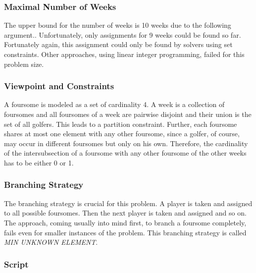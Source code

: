 \documentclass[a4paper]{scrartcl}
\begin{document}
\subsubsection{Maximal Number of Weeks}
The upper bound for the number of weeks is 10 weeks due to 
the following argument.. Unfortunately, only assignments 
for 9 weeks could be found so far. Fortunately again, 
this assignment could only be found by solvers using set 
constraints. Other approaches, using linear integer 
programming, failed for this problem size. 

\subsubsection{Viewpoint and Constraints}
A foursome is modeled as a set of cardinality 4. A week is 
a collection of foursomes and all foursomes of a week are 
pairwise disjoint and their union is the set of all golfers. 
This leads to a partition constraint. Further, each foursome 
shares at most one element with any other foursome, since 
a golfer, of course, may occur in different foursomes but 
only on his own. Therefore, the cardinality of the intersubsection 
of a foursome with any other foursome of the other weeks 
has to be either 0 or 1. 

\subsubsection{Branching Strategy}
The branching strategy is crucial for this problem.
A player is taken and assigned to all possible foursomes. 
Then the next player is taken and assigned and so on.
The approach, coming usually into mind first, to branch
a foursome completely, fails even for smaller instances of 
the problem. This branching strategy is called {\it MIN UNKNOWN 
ELEMENT}.

\subsubsection{Script}
\end{document}

